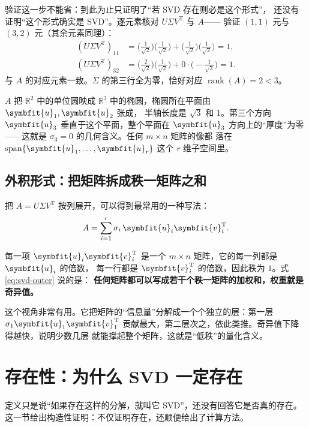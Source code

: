 \documentclass[UTF8, 11pt, a4paper, fontset=windows]{ctexart}
\theoremstyle{cnthm}
\theoremstyle{cndef}
\newcommand{\T}{^{\mathrm{T}}}
\newcommand{\R}{\mathbb{R}}
\DeclareMathOperator{\rank}{rank}
\DeclareMathOperator{\Span}{span}
\newcommand{\bu}{\symbfit{u}}
\newcommand{\vv}{\symbfit{v}}
\begin{document}
验证这一步不能省：到此为止只证明了“若 SVD 存在则必是这个形式”，
还没有证明“这个形式确实是 SVD”。逐元素核对 $U\Sigma V\T$ 与 $A$——
验证 $(1,1)$ 元与 $(3,2)$ 元（其余元素同理）：
\begin{align}
  (U\Sigma V\T)_{11}
  &=\Big(\tfrac{1}{\sqrt2}\Big)\Big(\tfrac{1}{\sqrt2}\Big)
   +\Big(\tfrac{1}{\sqrt2}\Big)\Big(\tfrac{1}{\sqrt2}\Big)=1,\\
  (U\Sigma V\T)_{32}
  &=\Big(\tfrac{2}{\sqrt2}\Big)\Big(\tfrac{1}{\sqrt2}\Big)
   +0\cdot\Big(-\tfrac{1}{\sqrt2}\Big)=1 .
\end{align}
与 $A$ 的对应元素一致。$\Sigma$ 的第三行全为零，恰好对应 $\rank(A)=2<3$。

\begin{insight}[这个例子说明了什么]
$A$ 把 $\R^2$ 中的单位圆映成 $\R^3$ 中的椭圆，椭圆所在平面由 $\bu_1,\bu_2$ 张成，
半轴长度是 $\sqrt3$ 和 $1$。第三个方向 $\bu_3$ 垂直于这个平面，整个平面在 $\bu_3$
方向上的“厚度”为零——这就是 $\sigma_3=0$ 的几何含义。任何 $m\times n$ 矩阵的像都
落在 $\Span\{\bu_1,\dots,\bu_r\}$ 这个 $r$ 维子空间里。
\end{insight}

\subsection{外积形式：把矩阵拆成秩一矩阵之和}

把 $A=U\Sigma V\T$ 按列展开，可以得到最常用的一种写法：
\begin{equation}\label{eq:svd-outer}
  A=\sum_{i=1}^{r}\sigma_i\,\bu_i\vv_i\T .
\end{equation}

每一项 $\bu_i\vv_i\T$ 是一个 $m\times n$ 矩阵，它的每一列都是 $\bu_i$ 的倍数，
每一行都是 $\vv_i\T$ 的倍数，因此秩为 $1$。式 \eqref{eq:svd-outer} 说的是：
\textbf{任何矩阵都可以写成若干个秩一矩阵的加权和，权重就是奇异值。}

这个视角非常有用。它把矩阵的“信息量”分解成一个个独立的层：第一层
$\sigma_1\bu_1\vv_1\T$ 贡献最大，第二层次之，依此类推。奇异值下降得越快，说明少数几层
就能撑起整个矩阵，这就是“低秩”的量化含义。

\section{存在性：为什么 SVD 一定存在}\label{sec:exist}

定义只是说“如果存在这样的分解，就叫它 SVD”，还没有回答它是否真的存在。
这一节给出构造性证明：不仅证明存在，还顺便给出了计算方法。
\end{document}
